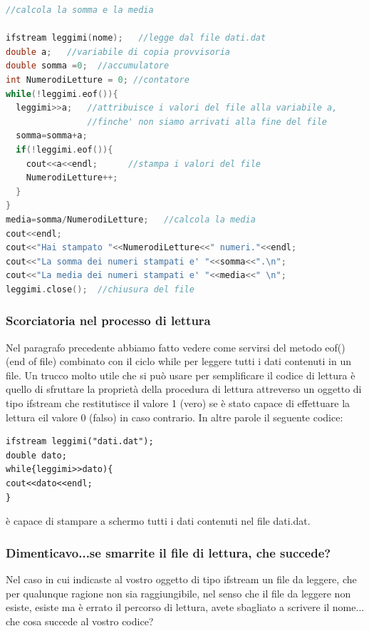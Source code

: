 \documentclass[11pt,fleqn]{book} %
\begin{document}
\begin{lstlisting}[language=c++]
//calcola la somma e la media

ifstream leggimi(nome);   //legge dal file dati.dat
double a;   //variabile di copia provvisoria
double somma =0;  //accumulatore
int NumerodiLetture = 0; //contatore         
while(!leggimi.eof()){
  leggimi>>a;   //attribuisce i valori del file alla variabile a, 
                //finche' non siamo arrivati alla fine del file
  somma=somma+a;
  if(!leggimi.eof()){
    cout<<a<<endl;      //stampa i valori del file
    NumerodiLetture++;
  }
}
media=somma/NumerodiLetture;   //calcola la media
cout<<endl;
cout<<"Hai stampato "<<NumerodiLetture<<" numeri."<<endl;
cout<<"La somma dei numeri stampati e' "<<somma<<".\n";
cout<<"La media dei numeri stampati e' "<<media<<" \n";
leggimi.close();  //chiusura del file
\end{lstlisting}


\subsubsection{Scorciatoria nel processo di lettura}

Nel paragrafo precedente abbiamo fatto vedere come servirsi del metodo eof() (end of file) combinato
con il ciclo while per leggere tutti i dati contenuti in un file. Un trucco molto utile che si può usare
per semplificare il codice di lettura è quello di sfruttare la proprietà della procedura di lettura attreverso un oggetto di tipo ifstream che restitutisce il valore 1 (vero) se è stato capace di effettuare la lettura eil valore 0 (falso) in caso contrario. In altre parole il seguente codice:

\begin{verbatim}
ifstream leggimi("dati.dat");
double dato;
while{leggimi>>dato){
cout<<dato<<endl;
}
\end{verbatim} 
è capace di stampare a schermo tutti i dati contenuti nel file dati.dat.


\subsubsection{Dimenticavo...se smarrite il file di lettura, che succede?}

Nel caso in cui indicaste al vostro oggetto di tipo ifstream un file da leggere, che per qualunque ragione non sia
raggiungibile, nel senso che il file da leggere non esiste, esiste ma è errato il percorso di lettura, avete sbagliato a scrivere il nome... che cosa succede al vostro codice?
 
\end{document}
